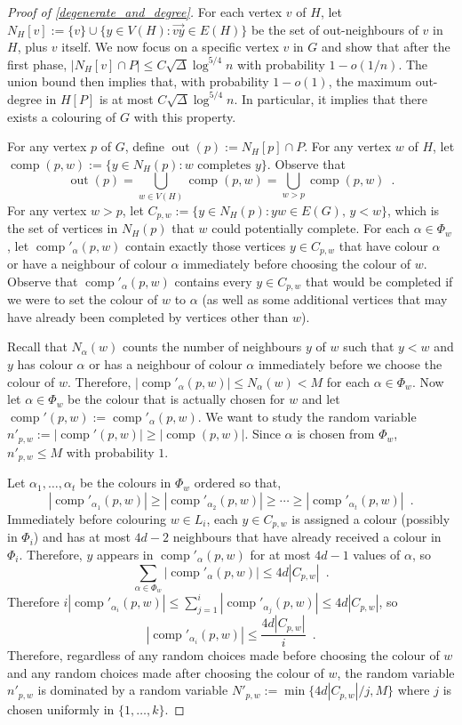 \documentclass{patmorin}
\DeclareMathOperator{\outn}{out}
\DeclareMathOperator{\comp}{comp}
\begin{document}
\begin{proof}[Proof of \cref{degenerate_and_degree}]
  For each vertex $v$ of $H$, let $N_H[v]:=\{v\}\cup \{y\in V(H): \overrightarrow{vy}\in E(H)\}$ be the set of out-neighbours of $v$ in $H$, plus $v$ itself.  We now focus on a specific vertex $v$ in $G$ and show that after the first phase, $|N_H[v]\cap P|\le C\sqrt{\Delta}\log^{5/4} n$ with probability $1-o(1/n)$.  The union bound then implies that, with probability $1-o(1)$, the maximum out-degree in $H[P]$ is at most $C\sqrt{\Delta}\log^{5/4} n$.  In particular, it implies that there exists a colouring of $G$ with this property.

  For any vertex $p$ of $G$, define $\outn(p):=N_H[p]\cap P$. For any vertex $w$ of $H$, let $\comp(p,w):=\{y\in N_H(p):\text{$w$ completes $y$}\}$.  Observe that
  \[
    \outn(p) = \bigcup_{w\in V(H)} \comp(p,w) = \bigcup_{w>p} \comp(p,w) \enspace .
  \]
  For any vertex $w>p$, let $C_{p,w}:=\{y\in N_H(p): yw\in E(G),\, y < w\}$, which is the set of vertices in $N_H(p)$ that $w$ could potentially complete.  For each $\alpha\in\Phi_w$, let $\comp'_\alpha(p,w)$ contain exactly those vertices $y\in C_{p,w}$ that have colour $\alpha$ or have a neighbour of colour $\alpha$ immediately before choosing the colour of $w$.  Observe that $\comp'_\alpha(p,w)$ contains every $y\in C_{p,w}$ that would be completed if we were to set the colour of $w$ to $\alpha$ (as well as some additional vertices that may have already been completed by vertices other than $w$).

  Recall that $N_\alpha(w)$ counts the number of neighbours $y$ of $w$ such that $y < w$ and $y$ has colour $\alpha$ or has a neighbour of colour $\alpha$ immediately before we choose the colour of $w$.  Therefore,  $|\comp'_\alpha(p,w)|\le N_\alpha(w)< M$ for each $\alpha\in\Phi_w$.  Now let $\alpha\in\Phi_w$ be the colour that is actually chosen for $w$ and let $\comp'(p,w):=\comp'_\alpha(p,w)$.  We want to study the random variable $n'_{p,w}:=|\comp'(p,w)|\ge |\comp(p,w)|$.  Since $\alpha$ is chosen from $\Phi_w$, $n'_{p,w}\le M$ with probability $1$.

  Let $\alpha_1,\ldots,\alpha_t$ be the colours in $\Phi_w$ ordered so that,
  \[
    |\comp'_{\alpha_1}(p,w)|\ge|\comp'_{\alpha_2}(p,w)|\ge\cdots\ge |\comp'_{\alpha_t}(p,w)| \enspace .
  \]
  Immediately before colouring $w\in L_i$, each $y\in C_{p,w}$ is assigned a colour (possibly in $\Phi_i$) and has at most $4d-2$ neighbours that have already received a colour in $\Phi_i$.  Therefore, $y$ appears in
  $\comp'_{\alpha}(p,w)$ for at most $4d-1$ values of $\alpha$, so
  \[
    \sum_{\alpha\in\Phi_w} |\comp'_{\alpha}(p,w)| \le 4d| C_{p,w}| \enspace .
  \]
  Therefore $i|\comp'_{\alpha_i}(p,w)|\le\sum_{j=1}^i|\comp'_{\alpha_j}(p,w)|\le 4d|C_{p,w}|$, so
  \[
    |\comp'_{\alpha_i}(p,w)|\le \frac{4d|C_{p,w}|}{i} \enspace .
  \]
  Therefore, regardless of any random choices made before choosing the colour of $w$ and any random choices made after choosing the colour of $w$, the random variable $n'_{p,w}$ is dominated by a random variable $N'_{p,w}:=\min\{4d|C_{p,w}|/j,M\}$ where $j$ is chosen uniformly in $\{1,\ldots,k\}$.


\end{proof}
\end{document}
